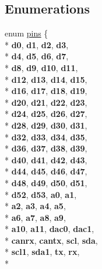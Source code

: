 \subsection*{Enumerations}
\begin{DoxyCompactItemize}
\item 
enum \hyperlink{namespacedue_a8ffa3ec309934ff9db34317e504bcc92}{pins} \{ \\*
{\bfseries d0}, 
{\bfseries d1}, 
{\bfseries d2}, 
{\bfseries d3}, 
\\*
{\bfseries d4}, 
{\bfseries d5}, 
{\bfseries d6}, 
{\bfseries d7}, 
\\*
{\bfseries d8}, 
{\bfseries d9}, 
{\bfseries d10}, 
{\bfseries d11}, 
\\*
{\bfseries d12}, 
{\bfseries d13}, 
{\bfseries d14}, 
{\bfseries d15}, 
\\*
{\bfseries d16}, 
{\bfseries d17}, 
{\bfseries d18}, 
{\bfseries d19}, 
\\*
{\bfseries d20}, 
{\bfseries d21}, 
{\bfseries d22}, 
{\bfseries d23}, 
\\*
{\bfseries d24}, 
{\bfseries d25}, 
{\bfseries d26}, 
{\bfseries d27}, 
\\*
{\bfseries d28}, 
{\bfseries d29}, 
{\bfseries d30}, 
{\bfseries d31}, 
\\*
{\bfseries d32}, 
{\bfseries d33}, 
{\bfseries d34}, 
{\bfseries d35}, 
\\*
{\bfseries d36}, 
{\bfseries d37}, 
{\bfseries d38}, 
{\bfseries d39}, 
\\*
{\bfseries d40}, 
{\bfseries d41}, 
{\bfseries d42}, 
{\bfseries d43}, 
\\*
{\bfseries d44}, 
{\bfseries d45}, 
{\bfseries d46}, 
{\bfseries d47}, 
\\*
{\bfseries d48}, 
{\bfseries d49}, 
{\bfseries d50}, 
{\bfseries d51}, 
\\*
{\bfseries d52}, 
{\bfseries d53}, 
{\bfseries a0}, 
{\bfseries a1}, 
\\*
{\bfseries a2}, 
{\bfseries a3}, 
{\bfseries a4}, 
{\bfseries a5}, 
\\*
{\bfseries a6}, 
{\bfseries a7}, 
{\bfseries a8}, 
{\bfseries a9}, 
\\*
{\bfseries a10}, 
{\bfseries a11}, 
{\bfseries dac0}, 
{\bfseries dac1}, 
\\*
{\bfseries canrx}, 
{\bfseries cantx}, 
{\bfseries scl}, 
{\bfseries sda}, 
\\*
{\bfseries scl1}, 
{\bfseries sda1}, 
{\bfseries tx}, 
{\bfseries rx}, 
\\*

\end{DoxyCompactItemize}
